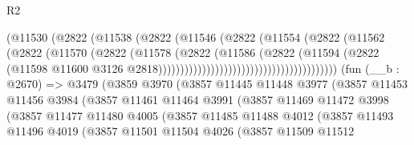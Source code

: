 \begin{lexlean}{R2}
\begin{coremodule}
                                                (@11530
                                                  (@2822
                                                    (@11538
                                                      (@2822
                                                        (@11546
                                                          (@2822
                                                            (@11554
                                                              (@2822
                                                                (@11562
                                                                  (@2822
                                                                    (@11570
                                                                      (@2822
                                                                        (@11578
                                                                          (@2822
                                                                            (@11586
                                                                              (@2822
                                                                                (@11594
                                                                                  (@2822
                                                                                    (@11598
                                                                                      @11600
                                                                                      @3126
                                                                                      @2818)))))))))))))))))))))))))))))))))))))))))
    (fun (__b : @2670) =>
    @3479
      (@3859
        @3970
        (@3857
          @11445
          @11448
          @3977
          (@3857
            @11453
            @11456
            @3984
            (@3857
              @11461
              @11464
              @3991
              (@3857
                @11469
                @11472
                @3998
                (@3857
                  @11477
                  @11480
                  @4005
                  (@3857
                    @11485
                    @11488
                    @4012
                    (@3857
                      @11493
                      @11496
                      @4019
                      (@3857
                        @11501
                        @11504
                        @4026
                        (@3857
                          @11509
                          @11512

\end{coremodule}
\end{lexlean}
